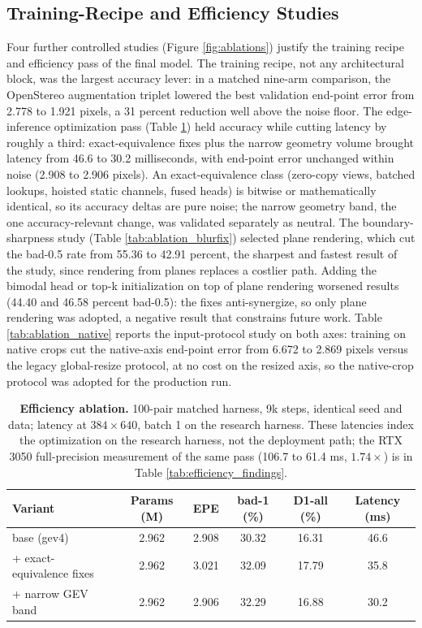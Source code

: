 \FloatBarrier
\subsection{Training-Recipe and Efficiency Studies}
Four further controlled studies (Figure \ref{fig:ablations}) justify
the training recipe and efficiency pass of the final model. The
training recipe, not any architectural block, was the largest accuracy
lever: in a matched nine-arm comparison, the OpenStereo augmentation
triplet lowered the best validation end-point error from 2.778 to
1.921 pixels, a 31 percent reduction well above the noise floor. The
edge-inference optimization pass (Table \ref{tab:ablation_efficiency})
held accuracy while cutting latency by roughly a third:
exact-equivalence fixes plus the narrow geometry volume brought
latency from 46.6 to 30.2 milliseconds, with end-point error unchanged
within noise (2.908 to 2.906 pixels). An exact-equivalence class
(zero-copy views, batched lookups, hoisted static channels, fused
heads) is bitwise or mathematically identical, so its accuracy deltas
are pure noise; the narrow geometry band, the one accuracy-relevant
change, was validated separately as neutral. The boundary-sharpness
study (Table \ref{tab:ablation_blurfix}) selected plane rendering,
which cut the bad-0.5 rate from 55.36 to 42.91 percent, the sharpest
and fastest result of the study, since rendering from planes replaces
a costlier path. Adding the bimodal head or top-k initialization on
top of plane rendering worsened results (44.40 and 46.58 percent
bad-0.5): the fixes anti-synergize, so only plane rendering was
adopted, a negative result that constrains future work. Table
\ref{tab:ablation_native} reports the input-protocol study on both
axes: training on native crops cut the native-axis end-point error
from 6.672 to 2.869 pixels versus the legacy global-resize protocol,
at no cost on the resized axis, so the native-crop protocol was
adopted for the production run.

\begin{table}[!htbp]
\centering
\caption{\textbf{Efficiency ablation.} 100-pair matched harness, 9k steps, identical seed and data; latency at $384\times 640$, batch 1 on the research harness. These latencies index the optimization on the research harness, not the deployment path; the RTX 3050 full-precision measurement of the same pass (106.7 to 61.4 ms, $1.74\times$) is in Table \ref{tab:efficiency_findings}.}
\label{tab:ablation_efficiency}
\small
\begin{tabular}{lccccc}
\toprule
Variant & Params (M) & EPE & bad-1 (\%) & D1-all (\%) & Latency (ms)\\
\midrule
base (gev4) & 2.962 & 2.908 & 30.32 & 16.31 & 46.6\\
+ exact-equivalence fixes & 2.962 & 3.021 & 32.09 & 17.79 & 35.8\\
+ narrow GEV band & 2.962 & 2.906 & 32.29 & 16.88 & 30.2\\
\bottomrule
\end{tabular}
\end{table}

